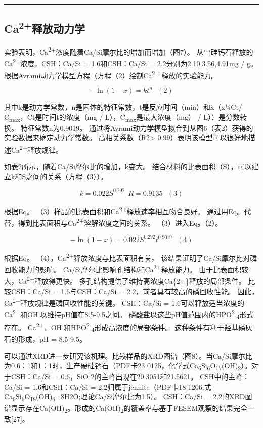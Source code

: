 \documentclass[11pt]{article}
\begin{document}
\noindent\rule{\textwidth}{0.5pt}
\subsection{Ca\textsuperscript{2+}释放动力学}
\label{sec:orgfec6faf}
实验表明，Ca\textsuperscript{2+}浓度随着Ca/Si摩尔比的增加而增加（图7）。 从雪硅钙石释放的
Ca\textsuperscript{2+}浓度，CSH：Ca/Si = 1.6和CSH：Ca/Si = 2.2分别为2.10,3.56,4.91mg / g。
根据Avrami动力学模型方程（方程（2）绘制Ca\textsuperscript{2 +}释放的实验能力。\cite{demirkıran07_dissol_kinet_ulexit_perch_acid_solut}

\[-\ln(1-x) = kt^{n} \ \ \ (2)\]

其中k是动力学常数，n是固体的特征常数，t是反应时间（min）和x（x¼Ct/ C\textsubscript{max}，Ct是时间t的浓度（mg / L），C\textsubscript{max}是最大浓度（mg） / L））是分数转换。 特征常数n为0.9019。 通过将Avrami动力学模型拟合到从图6（表2）获得的实验数据来确定动力学常数。 高相关系数（R2> 0.99）表明该模型可以很好地描述Ca\textsuperscript{2+}释放规律。


如表2所示，随着Ca/Si摩尔比的增加，k变大。 结合材料的比表面积（S），可以建立k和S之间的关系（方程（3））。

\[k = 0.022S^{0.292} \ \ R = 0.9135 \ \ \ (3)\]

根据Eq。 （3）样品的比表面积和Ca\textsuperscript{2+}释放速率相互吻合良好。 通过用Eq。代替，得到比表面积与Ca\textsuperscript{2+}溶解浓度之间的关系。 （3）进入Eq。（2）。

\[-\ln(1-x) = 0.022S^{0.292}t^{0.9019} \ \ \ (4)\]

根据Eq。 （4），Ca\textsuperscript{2+}释放浓度与比表面积有关。 该结果证明了Ca/Si摩尔比对磷回收能力的影响。 Ca/Si摩尔比影响孔结构和Ca\textsuperscript{2+}释放能力。 由于比表面积较大，Ca\textsuperscript{2+}释放得更快。 多孔结构提供了维持高浓度Ca\{2+\}释放的局部条件。 比较CSH：Ca/Si = 1.6与CSH：Ca/Si = 2.2，前者具有较高的磷回收性能。 因此，Ca\textsuperscript{2+}释放规律是磷回收性能的关键。 CSH：Ca/Si = 1.6可以释放适当浓度的Ca\textsuperscript{2+}和OH\textsuperscript{-}以维持pH值在8.5-9.5之间。 磷酸盐以这些pH值范围内的HPO\textsuperscript{2-}\textsubscript{4}形式存在。\cite{liu12_remov_high_concen_phosp_by_calcit} Ca\textsuperscript{2+}，OH\textsuperscript{-}和HPO\textsuperscript{2-}\textsubscript{4}形成高浓度的局部条件。 这种条件有利于羟基磷灰石的形成，pH = 8.5-9.5。


可以通过XRD进一步研究该机理。比较样品的XRD图谱（图8）。当Ca/Si摩尔比为0.6：1和1：1时，生产硬硅钙石（PDF卡23 0125，化学式Ca\textsubscript{6}Si\textsubscript{6}O\textsubscript{17}(OH)\textsubscript{2}）。对于CSH：Ca/Si = 0.6，SiO 2的主峰出现在20.3051和21.5621。 CSH中的主峰：Ca/Si = 1.6和CSH：Ca/Si = 2.2归属于jennite（PDF卡18-1206;式Ca\textsubscript{9}Si\textsubscript{6}O\textsubscript{18}(OH)\textsubscript{6}·8H2O;理论Ca/Si摩尔比为1.5）。 CSH：Ca/Si = 2.2的XRD图谱显示存在Ca(OH)\textsubscript{2}。形成的Ca(OH)\textsubscript{2}的覆盖率与基于FESEM观察的结果完全一致[27]。
\end{document}
